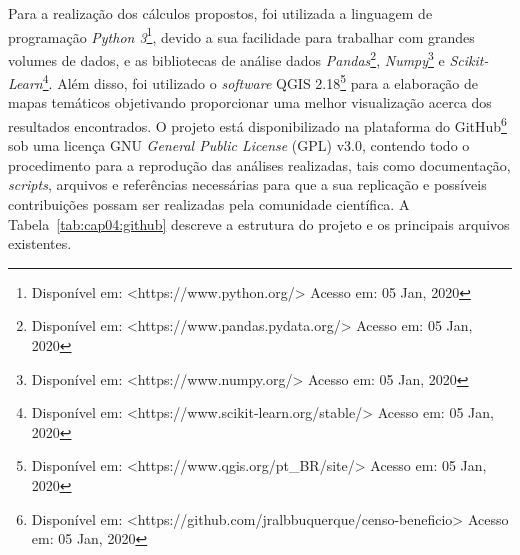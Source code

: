 Para a realização dos cálculos propostos, foi utilizada a linguagem de programação \textit{Python 3}\footnote{Disponível em: <https://www.python.org/> Acesso em: 05 Jan, 2020}, devido a sua facilidade para trabalhar com grandes volumes de dados, e as bibliotecas de análise dados \textit{Pandas}\footnote{Disponível em: <https://www.pandas.pydata.org/> Acesso em: 05 Jan, 2020}, \textit{Numpy}\footnote{Disponível em: <https://www.numpy.org/> Acesso em: 05 Jan, 2020} e \textit{Scikit-Learn}\footnote{Disponível em: <https://www.scikit-learn.org/stable/> Acesso em: 05 Jan, 2020}. Além disso, foi utilizado o \textit{software} QGIS 2.18\footnote{Disponível em: <https://www.qgis.org/pt\_BR/site/> Acesso em: 05 Jan, 2020} para a elaboração de mapas temáticos objetivando proporcionar uma melhor visualização acerca dos resultados encontrados. O projeto está disponibilizado na plataforma do GitHub\footnote{Disponível em: <https://github.com/jralbbuquerque/censo-beneficio> Acesso em: 05 Jan, 2020} sob uma licença GNU \textit{General Public License} (GPL) v3.0, contendo todo o procedimento para a reprodução das análises realizadas, tais como documentação, \textit{scripts}, arquivos e referências necessárias para que a sua replicação e possíveis contribuições possam ser realizadas pela comunidade científica. A Tabela~\ref{tab:cap04:github} descreve a estrutura do projeto e os principais arquivos existentes.

\newpage

